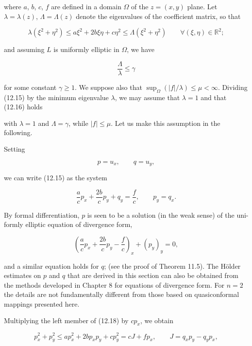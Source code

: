where $a$, $b$, $c$, $f$ are defined in a domain $\Omega$ of the $z=(x,y)$ plane. Let $\lambda=\lambda(z)$, $\Lambda=\Lambda(z)$ denote the eigenvalues of the coefficient matrix, so that

\begin{equation}
\tag{12.16}
\lambda(\xi^2+\eta^2)\le a\xi^2+2b\xi\eta+c\eta^2\le \Lambda(\xi^2+\eta^2)\qquad \forall(\xi,\eta)\in\mathbb{R}^2;
\end{equation}

and assuming $L$ is uniformly elliptic in $\Omega$, we have

\begin{equation}
\tag{12.17}
\frac{\Lambda}{\lambda}\le \gamma
\end{equation}

for some constant $\gamma\ge 1$. We suppose also that $\sup_{\Omega}(|f|/\lambda)\le \mu<\infty$. Dividing (12.15) by the minimum eigenvalue $\lambda$, we may assume that $\lambda=1$ and that (12.16) holds


with $\lambda=1$ and $\Lambda=\gamma$, while $|f|\le \mu$. Let us make this assumption in the following.

Setting

\[
p=u_x,\qquad q=u_y,
\]

we can write (12.15) as the system

\begin{equation}\tag{12.18}
\frac{a}{c}p_x+\frac{2b}{c}p_y+q_y=\frac{f}{c},\qquad p_y=q_x.
\end{equation}

By formal differentiation, $p$ is seen to be a solution (in the weak sense) of the uni-
formly elliptic equation of divergence form,

\[
\left(\frac{a}{c}p_x+\frac{2b}{c}p_y-\frac{f}{c}\right)_x+(p_y)_y=0,
\]

and a similar equation holds for $q$; (see the proof of Theorem 11.5). The H\"older
estimates on $p$ and $q$ that are derived in this section can also be obtained from the
methods developed in Chapter 8 for equations of divergence form. For $n=2$ the
details are not fundamentally different from those based on quasiconformal
mappings presented here.

Multiplying the left member of (12.18) by $cp_x$, we obtain

\[
p_x^2+p_y^2\le ap_x^2+2bp_xp_y+cp_y^2=cJ+fp_x,\qquad J=q_xp_y-q_yp_x,
\]

